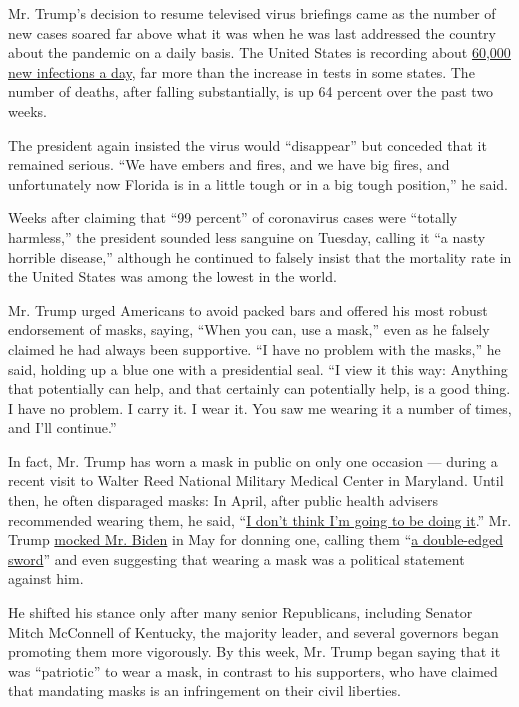 Mr. Trump's decision to resume televised virus briefings came as the
number of new cases soared far above what it was when he was last
addressed the country about the pandemic on a daily basis. The United
States is recording about
\href{https://www.nytimes.com/interactive/2020/us/coronavirus-us-cases.html}{60,000
new infections a day}, far more than the increase in tests in some
states. The number of deaths, after falling substantially, is up 64
percent over the past two weeks.

The president again insisted the virus would ``disappear'' but conceded
that it remained serious. ``We have embers and fires, and we have big
fires, and unfortunately now Florida is in a little tough or in a big
tough position,'' he said.

Weeks after claiming that ``99 percent'' of coronavirus cases were
``totally harmless,'' the president sounded less sanguine on Tuesday,
calling it ``a nasty horrible disease,'' although he continued to
falsely insist that the mortality rate in the United States was among
the lowest in the world.

Mr. Trump urged Americans to avoid packed bars and offered his most
robust endorsement of masks, saying, ``When you can, use a mask,'' even
as he falsely claimed he had always been supportive. ``I have no problem
with the masks,'' he said, holding up a blue one with a presidential
seal. ``I view it this way: Anything that potentially can help, and that
certainly can potentially help, is a good thing. I have no problem. I
carry it. I wear it. You saw me wearing it a number of times, and I'll
continue.''

In fact, Mr. Trump has worn a mask in public on only one occasion ---
during a recent visit to Walter Reed National Military Medical Center in
Maryland. Until then, he often disparaged masks: In April, after public
health advisers recommended wearing them, he said,
``\href{https://www.nytimes.com/video/us/politics/100000007070943/trump-mask-coronavirus.html}{I
don't think I'm going to be doing it}.'' Mr. Trump
\href{https://www.nytimes.com/2020/05/26/us/politics/joe-biden-facemasks-trump-coronavirus.html}{mocked
Mr. Biden} in May for donning one, calling them
``\href{https://www.wsj.com/articles/trump-talks-juneteenth-john-bolton-economy-in-wsj-interview-11592493771}{a
double-edged sword}'' and even suggesting that wearing a mask was a
political statement against him.

He shifted his stance only after many senior Republicans, including
Senator Mitch McConnell of Kentucky, the majority leader, and several
governors began promoting them more vigorously. By this week, Mr. Trump
began saying that it was ``patriotic'' to wear a mask, in contrast to
his supporters, who have claimed that mandating masks is an infringement
on their civil liberties.

